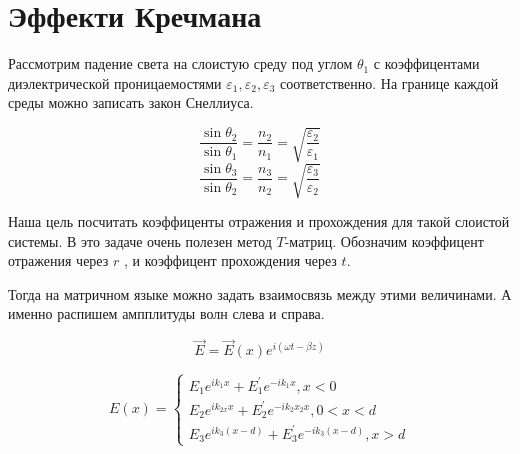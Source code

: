 \section{Эффекти Кречмана}
\begin{center}
\end{center}



Рассмотрим падение света на слоистую среду под углом $ 
\theta_1 $ с коэффицентами  диэлектрической проницаемостями $ \varepsilon_1, \varepsilon_2, \varepsilon_3 $ соответственно. 
На границе каждой среды можно записать закон Снеллиуса.

	$$
	\frac{\sin{\theta_2}}{\sin{\theta_1}} = \frac{n_2}{n_1} =\sqrt{\frac{\varepsilon_{2}}{\varepsilon_1}}	$$
	$$
	\frac{{\sin\theta_3}}{\sin{\theta_2}} = \frac{n_3}{n_2} =\sqrt{\frac{\varepsilon_{3}}{\varepsilon_2}}	
	$$

Наша цель посчитать коэффиценты отражения и прохождения для такой слоистой системы. В это задаче очень полезен метод $ T $-матриц. Обозначим коэффицент отражения через $ r $ , и коэффицент прохождения через $ t $.

Тогда на матричном языке можно задать взаимосвязь между этими величинами. А именно распишем ампплитуды волн слева и справа.

$$\vec{E}=\vec{E}(x) e^{i(\omega t-\beta z)}$$

$$E(x)=\left\{\begin{array}{c}
E_{1} e^{i k_{1} x}+E_{1}^{\prime} e^{-i k_{1} x}, x<0 \\
E_{2} e^{i k_{2 x} x}+E_{2}^{\prime} e^{-i k_{2} x_{2} x}, 0<x<d \\
E_{3} e^{i k_{3}(x-d)}+E_{3}^{\prime} e^{-i k_{3}(x-d)}, x>d
\end{array}\right.$$

